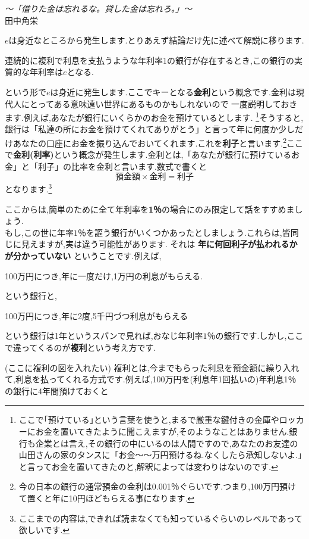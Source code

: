 \begin{flushright}
\textit {〜「借りた金は忘れるな。貸した金は忘れろ。」〜}\\
田中角栄
\end{flushright}

$e$は身近なところから発生します.とりあえず結論だけ先に述べて解説に移ります.
\begin{center}
連続的に複利で利息を支払うような年利率$1$の銀行が存在するとき,この銀行の実質的な年利率は$e$となる.
\end{center}
という形で$e$は身近に発生します.ここでキーとなる{\bf 金利}という概念です.金利は現代人にとってある意味遠い世界にあるものかもしれないので
一度説明しておきます.例えば,あなたが銀行にいくらかのお金を預けているとします.
\footnote{ここで｢預けている｣という言葉を使うと,まるで厳重な鍵付きの金庫やロッカーにお金を置いてきたように聞こえますが,そのようなことはありません.銀行も企業とは言え,その銀行の中にいるのは人間ですので,あなたのお友達の山田さんの家のタンスに「お金〜〜万円預けるね.なくしたら承知しないよ.」と言ってお金を置いてきたのと,解釈によっては変わりはないのです.}そうすると,銀行は「私達の所にお金を預けてくれてありがとう」と言って年に何度か少しだけあなたの口座にお金を振り込んでおいてくれます.これを{\bf 利子}と言います.\footnote{今の日本の銀行の通常預金の金利は0.001％ぐらいです.つまり,100万円預けて置くと年に10円ほどもらえる事になります.}ここで{\bf 金利(利率)}という概念が発生します.金利とは,「あなたが銀行に預けているお金」と「利子」の比率を金利と言います.数式で書くと
\[
\mbox{預金額}\times\mbox{金利} = \mbox{利子}
\]
となります.\footnote{ここまでの内容は,できれば読まなくても知っているぐらいのレベルであって欲しいです.}\par
ここからは,簡単のために全て年利率を{\bf 1％}の場合にのみ限定して話をすすめましょう.\\
もし,この世に年率$1$％を謳う銀行がいくつかあったとしましょう.これらは,皆同じに見えますが,実は違う可能性があります.
それは {\bf 年に何回利子が払われるかが分かっていない} ということです.例えば,
\begin{center}
100万円につき,年に一度だけ,1万円の利息がもらえる.
\end{center}
という銀行と,
\begin{center}
100万円につき,年に2度,5千円づつ利息がもらえる
\end{center}
という銀行は1年というスパンで見れば,おなじ年利率$1$％の銀行です.しかし,ここで違ってくるのが{\bf 複利}という考え方です.\par
(ここに複利の図を入れたい)
複利とは,今までもらった利息を預金額に繰り入れて,利息を払ってくれる方式です.例えば,100万円を(利息年1回払いの)年利息1％の銀行に$4$年間預けておくと
